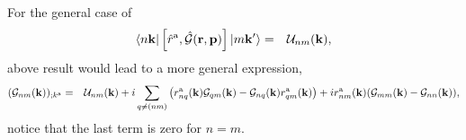 For the general
case of
\begin{eqnarray}\label{a.8}
\langle n\mathbf{k} |
\left[\hat r^{\mathrm{a}},\hat{{\mathbf{\cal G}}}(\mathbf{r},\mathbf{p})\right]
| m\mathbf{k}' \rangle
&=&
{\cal U}_{nm}(\mathbf{k})
,
\end{eqnarray}
above result would lead to a more general expression, 
\begin{eqnarray}\label{a.9}
({\mathbf{\cal G}}_{nm}(\mathbf{k}))_{;k^{\mathrm{a}}}
&=&
{\cal U}_{nm}(\mathbf{k})
+
i\sum_{q\ne(nm)}
\left(
r_{nq}^{\mathrm{a}} (\mathbf{k})
{\mathbf{\cal G}}_{qm}(\mathbf{k})
-
{\mathbf{\cal G}}_{nq}(\mathbf{k})
r_{qm}^{\mathrm{a}} (\mathbf{k})
\right)
+ir_{nm}^{\mathrm{a}} (\mathbf{k}) ({\mathbf{\cal G}}_{mm}(\mathbf{k})-{\mathbf{\cal G}}_{nn}(\mathbf{k}))
,
\nonumber\\
\end{eqnarray}
notice that the last term is zero for $n=m$.

